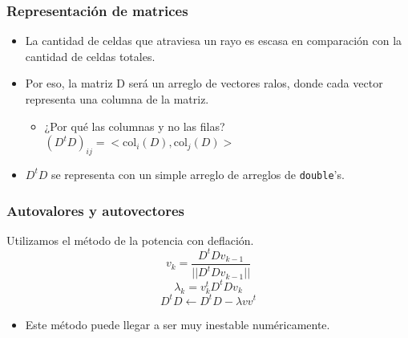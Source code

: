\documentclass{beamer}
\begin{document}
\begin{frame}
\frametitle{Representación de matrices}
\begin{itemize}
\item<1-> La cantidad de celdas que atraviesa un rayo es escasa en comparación con la cantidad de celdas totales.
\item<2-> Por eso, la matriz D será un arreglo de vectores ralos, donde cada vector representa una columna de la matriz.
\begin{itemize}
\item<3-> ¿Por qué las columnas y no las filas? $(D^tD)_{ij} = <\text{col}_i(D),\text{col}_j(D)>$


\end{itemize}
\item<4-> $D^tD$ se representa con un simple arreglo de arreglos de \texttt{double}'s.
\end{itemize}
\end{frame}

\begin{frame}
\frametitle{Autovalores y autovectores}
Utilizamos el método de la potencia con deflación.
\[
v_k = \frac{D^tD v_{k-1}}{||D^tD v_{k-1}||}
\]
\[
\lambda_k = v_k^tD^tDv_k
\]
\[
D^tD \gets D^tD - \lambda v v^t
\]

\begin{itemize}
\item<1-> Este método puede llegar a ser muy inestable numéricamente.
\end{itemize}
\end{frame}
\end{document}
